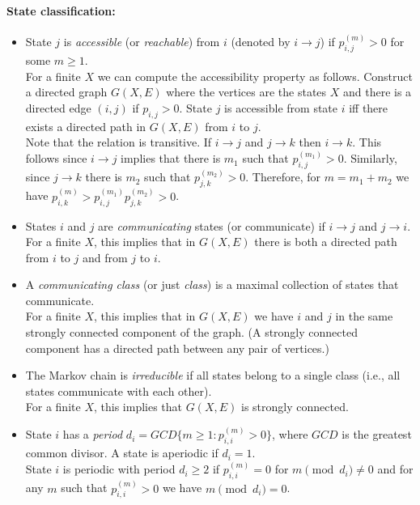 \paragraph{State classification:}

\begin{itemize}
\item State $j$ is \textit{accessible} (or \textit{reachable}) from $i$  (denoted by $i \to j$) if $p_{i,j}^{(m)} > 0$ for some $m \ge
1$.\\
For a finite $X$  we can compute the accessibility property as
follows. Construct a directed graph $G(X,E)$ where the vertices are
the states $X$ and there is a directed edge $(i,j)$ if $p_{i,j}>0$.
State $j$ is accessible from state $i$ iff there exists a directed
path in $G(X,E)$ from $i$ to $j$.\\
Note that the relation is transitive. If $i \to j$ and $j \to k$ then $i \to k$. This follows since $i \to j$ implies that there is $m_1$ such that  $p_{i,j}^{(m_1)} > 0$. Similarly, since $j \to k$ there is $m_2$ such that  $p_{j,k}^{(m_2)} > 0$. Therefore, for $m=m_1+m_2$ we have $p_{i,k}^{(m)} > p_{i,j}^{(m_1)}p_{j,k}^{(m_2)}>0$.
\item States $i$ and $j$ are \textit{communicating} states (or communicate) if $i \to j$ and $j \to
i$.\\
For a finite $X$, this implies that in $G(X,E)$ there is both a
directed path from $i$ to $j$ and from $j$ to $i$.
\item A \textit{communicating class} (or just
\emph{class}) is a maximal collection of states that communicate.\\
For a finite $X$, this implies that in $G(X,E)$ we have $i$ and $j$
in the same strongly connected component of the graph. (A strongly
connected component has a directed path between any pair of
vertices.)
\item The Markov chain is
\textit{irreducible} if all states belong to a single class (i.e.,
all states communicate with each other).\\
For a finite $X$, this implies that $G(X,E)$ is strongly
connected.
\item
State $i$ has a \textit{period} $d_i=GCD \{m\geq
1:p_{i,i}^{(m)}>0\}$, where $GCD$ is the greatest common divisor. A
state is aperiodic if $d_i=1$.\\
State $i$ is periodic with period $d_i \ge 2$ if  $p_{i,i}^{(m)} =
0$ for $m \pmod {d_i} \neq 0$ and for any $m$ such that
$p_{i,i}^{(m)} > 0$ we have $m \pmod {d_i} =0$.\\

\end{itemize}
